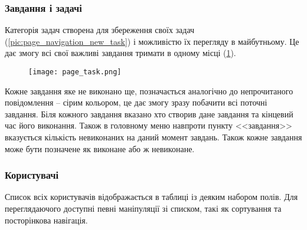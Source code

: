\subsubsection{Завдання і задачі}
\par Категорія задач створена для збереження своїх задач (\ref{pic:page_navigation_new_task}) і можливістю їх перегляду в майбутньому. Це дає змогу всі свої важливі завдання тримати в одному місці (\ref{pic:page_task}).
  \begin{figure}[!ht]
  \centering
      \texttt{[image: page\_task.png]}
      \label{pic:page_task}
  \end{figure}
\par Кожне завдання яке не виконано ще, позначається аналогічно до непрочитаного повідомлення -- сірим кольором, це дає змогу зразу побачити всі поточні завдання. Біля кожного завдання вказано хто створив дане завдання та кінцевий час його виконання. Також в головному меню навпроти пункту <<завдання>> вказується кількість невиконаних на даний момент завдань. Також кожне завдання може бути позначене як виконане або ж невиконане.

\subsubsection{Користувачі}
\par Список всіх користувачів відображається в таблиці із деяким набором полів. Для переглядаючого доступні певні маніпуляції зі списком, такі як сортування та посторінкова навігація.